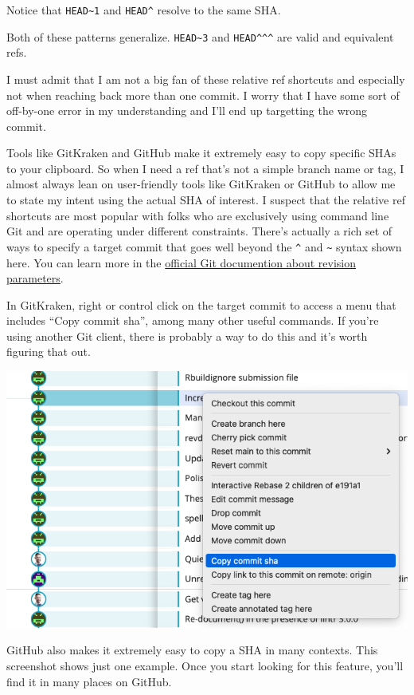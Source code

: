\documentclass[
]{book}
\begin{document}
Notice that \texttt{HEAD\textasciitilde{}1} and \texttt{HEAD\^{}} resolve to the same SHA.

Both of these patterns generalize.
\texttt{HEAD\textasciitilde{}3} and \texttt{HEAD\^{}\^{}\^{}} are valid and equivalent refs.

I must admit that I am not a big fan of these relative ref shortcuts and especially not when reaching back more than one commit.
I worry that I have some sort of off-by-one error in my understanding and I'll end up targetting the wrong commit.

Tools like GitKraken and GitHub make it extremely easy to copy specific SHAs to your clipboard.
So when I need a ref that's not a simple branch name or tag, I almost always lean on user-friendly tools like GitKraken or GitHub to allow me to state my intent using the actual SHA of interest.
I suspect that the relative ref shortcuts are most popular with folks who are exclusively using command line Git and are operating under different constraints.
There's actually a rich set of ways to specify a target commit that goes well beyond the \texttt{\^{}} and \texttt{\textasciitilde{}} syntax shown here.
You can learn more in the \href{https://git-scm.com/docs/gitrevisions}{official Git documention about revision parameters}.

In GitKraken, right or control click on the target commit to access a menu that includes ``Copy commit sha'', among many other useful commands.
If you're using another Git client, there is probably a way to do this and it's worth figuring that out.

\begin{center}\includegraphics[width=0.6\linewidth]{img/gitkraken-screenshot-copy-commit-sha} \end{center}

GitHub also makes it extremely easy to copy a SHA in many contexts.
This screenshot shows just one example.
Once you start looking for this feature, you'll find it in many places on GitHub.
\end{document}
